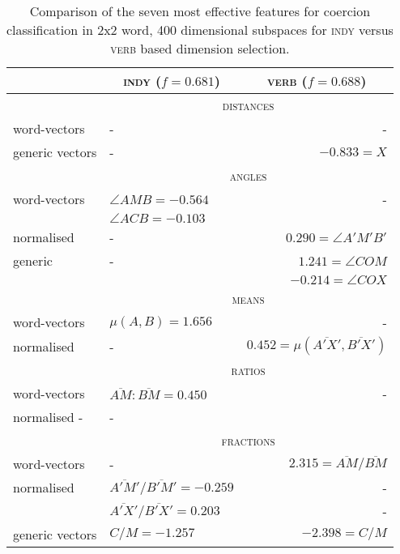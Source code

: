 \begin{table}
\centering
\begin{tabular}{llr}
\hline
& \multicolumn{1}{c}{\textsc{indy} ($f = 0.681$)} & \multicolumn{1}{c}{\textsc{verb} ($f = 0.688$)} \\
\hline
& \multicolumn{2}{c}{\textsc{distances}} \\
word-vectors & - & - \\
generic vectors & - & $-0.833 = X$ \\
\hline
& \multicolumn{2}{c}{\textsc{angles}} \\
word-vectors & $\angle AMB = -0.564$ & - \\
& $\angle ACB = -0.103$ \\
normalised & - & $0.290 = \angle A'M'B'$ \\
generic & - & $1.241 = \angle COM$ \\
& & $-0.214 = \angle COX$ \\
\hline
& \multicolumn{2}{c}{\textsc{means}} \\
word-vectors & $\mu(A,B) = 1.656$ & - \\
normalised & - & $0.452 = \mu(\overline{A'X'},\overline{B'X'})$ \\
\hline
& \multicolumn{2}{c}{\textsc{ratios}} \\
word-vectors & $\overline{AM}:\overline{BM} = 0.450$ & - \\
normalised - & - \\
\hline
& \multicolumn{2}{c}{\textsc{fractions}} \\
word-vectors & - & $2.315 = \overline{AM}/\overline{BM}$ \\
normalised & $\overline{A'M'}/\overline{B'M'} = -0.259$ & - \\
& $\overline{A'X'}/\overline{B'X'} = 0.203$ & - \\
generic vectors & $C/M = -1.257$ & $-2.398 = C/M$ \\
\hline
\end{tabular}
\caption{Comparison of the seven most effective features for coercion classification in 2x2 word, 400 dimensional subspaces for \textsc{indy} versus \textsc{verb} based dimension selection.}
\label{tab:coertures}
\end{table}


